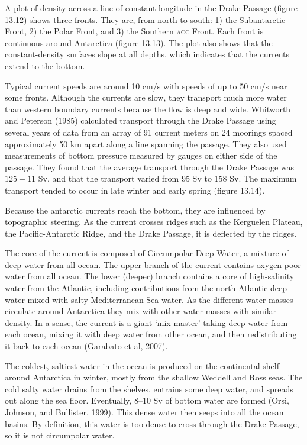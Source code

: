 A plot of density across a line of constant longitude in the Drake
Passage (figure 13.12) shows three fronts. They are, from north to
south: 1) the Subantarctic Front, 2) the Polar Front, and 3) the
Southern \textsc{acc} Front. Each front is continuous around
Antarctica (figure 13.13). The plot also shows that the
constant-density surfaces slope at all depths, which indicates that
the currents extend to the bottom.

Typical current speeds are around 10 cm/s with speeds of up to 50 cm/s
near some fronts. Although the currents are slow, they
transport much more water than
western boundary currents because the flow is deep and wide. Whitworth
and Peterson (1985) calculated transport through the Drake
Passage using several years of
data from an array of 91 current meters on 24 moorings spaced
approximately 50 km apart along a line spanning the passage. They also
used measurements of bottom pressure measured by gauges on either side
of the passage. They found that the average transport through the
Drake Passage was $125 \pm 11$ Sv, and that the transport varied from
95 Sv to 158 Sv. The maximum transport tended to occur in late winter
and early spring (figure 13.14).

Because the antarctic currents reach the bottom, they are influenced
by topographic steering. As the current crosses ridges such as the
Kerguelen Plateau, the Pacific-Antarctic Ridge, and the Drake Passage,
it is deflected by the ridges.

The core of the current is composed of Circumpolar Deep
Water, a mixture of deep
water from all ocean. The upper branch of the current contains
oxygen-poor water from all ocean. The lower (deeper) branch contains a
core of high-salinity water from the Atlantic, including contributions
from the north Atlantic deep water mixed with salty Mediterranean Sea
water. As the different water masses circulate around Antarctica they
mix with other water masses with similar density. In a sense, the
current is a giant `mix-master' taking deep water from each ocean,
mixing it with deep water from
other ocean, and then redistributing it back to each ocean (Garabato
et al, 2007).

The coldest, saltiest water in the ocean is produced on the
continental shelf around Antarctica in winter, mostly from the shallow
Weddell and Ross seas. The cold salty water drains from the shelves,
entrains some deep water, and spreads out along the sea
floor. Eventually, 8--10 Sv of bottom water are formed (Orsi, Johnson,
and Bullister, 1999). This dense water then seeps into all the ocean
basins. By definition, this water is too dense to cross through the
Drake Passage, so it is not circumpolar water.

